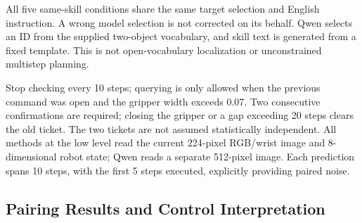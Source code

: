 All five same-skill conditions share the same target selection and English instruction. A wrong model selection is not corrected on its behalf. Qwen selects an ID from the supplied two-object vocabulary, and skill text is generated from a fixed template. This is not open-vocabulary localization or unconstrained multistep planning.

Stop checking every 10 steps; querying is only allowed when the previous command was open and the gripper width exceeds 0.07. Two consecutive confirmations are required; closing the gripper or a gap exceeding 20 steps clears the old ticket. The two tickets are not assumed statistically independent. All methods at the low level read the current 224-pixel RGB/wrist image and 8-dimensional robot state; Qwen reads a separate 512-pixel image. Each prediction spans 10 steps, with the first 5 steps executed, explicitly providing paired noise.

\subsection{Pairing Results and Control Interpretation}\label{s13-detail-3}

